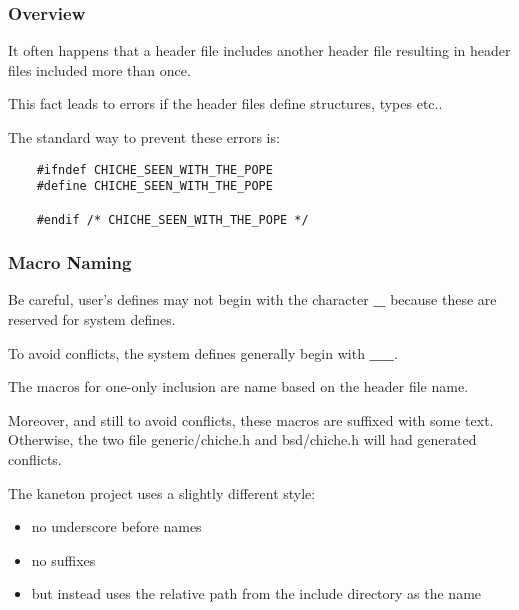\documentclass[8pt]{beamer}
\newcommand{\nl}[0]{\vspace{0.4cm}}
\begin{document}
\begin{frame}[containsverbatim]
  \frametitle{Overview}

  It often happens that a header file includes another header file resulting
  in header files included more than once.

  \nl

  This fact leads to errors if the header files define structures, types etc..

  \nl

  The standard way to prevent these errors is:

  \begin{verbatim}
    #ifndef CHICHE_SEEN_WITH_THE_POPE
    #define CHICHE_SEEN_WITH_THE_POPE

    #endif /* CHICHE_SEEN_WITH_THE_POPE */
  \end{verbatim}
\end{frame}


\begin{frame}
  \frametitle{Macro Naming}

  Be careful, user's defines may not begin with the character \textbf{\_}
  because these are reserved for system defines.

  \nl

  To avoid conflicts, the system defines generally begin with \textbf{\_\_}.

  \nl

  The macros for one-only inclusion are name based on the header file name.

  \nl

  Moreover, and still to avoid conflicts, these macros are suffixed with
  some text. Otherwise, the two file generic/chiche.h and bsd/chiche.h
  will had generated conflicts.

  \nl

  The kaneton project uses a slightly different style:

  \begin{itemize}[<+->]
    \item
      no underscore before names
    \item
      no suffixes
    \item
      but instead uses the relative path from the include directory
      as the name
  \end{itemize}

\end{frame}

\end{document}
